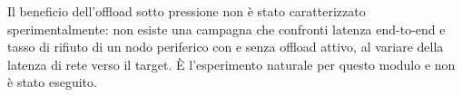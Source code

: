 \begin{damisurare}
Il beneficio dell'offload sotto pressione non \`e stato caratterizzato
sperimentalmente: non esiste una campagna che confronti latenza end-to-end e
tasso di rifiuto di un nodo periferico con e senza offload attivo, al variare
della latenza di rete verso il target. \`E l'esperimento naturale per questo
modulo e non \`e stato eseguito.
\end{damisurare}
